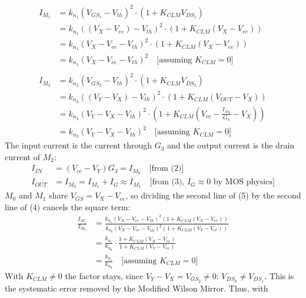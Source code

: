 \begin{enumerate}
\begin{align*}
      I_{M_1} &= k_{n_1}(V_{GS_1} - V_{th})^2 \cdot (1 + K_{CLM} V_{DS_1}) \\
              &= k_{n_1}((V_{X} - V_{ee}) - V_{th})^2 \cdot (1 + K_{CLM} (V_{X} - V_{ee})) \\
              &= k_{n_1}\left(V_{X} - V_{ee} - V_{th}\right)^2 \cdot \left(1 + K_{CLM} (V_{X} - V_{ee})\right) \\
              &= k_{n_1}\left(V_{X} - V_{ee} - V_{th}\right)^2 \quad \text{[assuming } K_{CLM} = 0 \text{]} \tag{5} \\ \\
      I_{M_2} &= k_{n_2}(V_{GS_2} - V_{th})^2 \cdot (1 + K_{CLM} V_{DS_2}) \\
              &= k_{n_2}((V_{Y} - V_{X}) - V_{th})^2 \cdot (1 + K_{CLM} (V_{OUT} - V_{X})) \\
              &= k_{n_2}\left(V_{Y} - V_{X} - V_{th}\right)^2 \cdot \left(1 + K_{CLM} \left(V_{cc} - \frac{I_{M_2}}{G_4} - V_{X}\right)\right) \\
              &= k_{n_2}\left(V_{Y} - V_{X} - V_{th}\right)^2 \quad \text{[assuming } K_{CLM} = 0 \text{]} \tag{6}
    \end{align*}
    The input current is the current through \(G_3\) and the output
    current is the drain current of \(M_2\):
    \begin{align*}
      I_{IN} &= (V_{cc} - V_Y)G_3 = I_{M_0} \quad \text{[from (2)]} \\
      I_{OUT} &= I_{M_2} = I_{M_1} + I_{G} \approx I_{M_1} \quad \text{[from (3), } I_{G} \approx 0 \text{ by MOS physics]}
    \end{align*}
    \(M_0\) and \(M_1\) share \(V_{GS} = V_X - V_{ee}\), so dividing the
    second line of (5) by the second line of (4) cancels the square term:
    \begin{align*}
      \frac{I_{M_1}}{I_{M_0}} &= \frac{k_{n_1}(V_{X} - V_{ee} - V_{th})^2 (1 + K_{CLM} (V_{X} - V_{ee}))}{k_{n_0}(V_{X} - V_{ee} - V_{th})^2 (1 + K_{CLM} (V_{Y} - V_{ee}))} \\
                              &= \frac{k_{n_1}}{k_{n_0}} \cdot \frac{1 + K_{CLM} (V_{X} - V_{ee})}{1 + K_{CLM} (V_{Y} - V_{ee})} \\
                              &= \frac{k_{n_1}}{k_{n_0}} \quad \text{[assuming } K_{CLM} = 0 \text{]}
    \end{align*}
    With \(K_{CLM} \neq 0\) the factor stays, since
    \(V_Y - V_X = V_{GS_2} \neq 0\): \(V_{DS_0} \neq V_{DS_1}\). This is the
    systematic error removed by the Modified Wilson Mirror. Thus, with

\end{enumerate}

